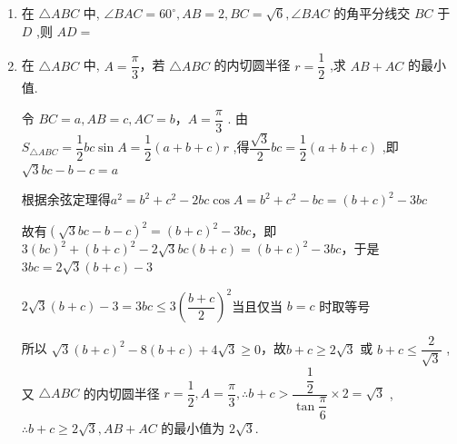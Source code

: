 \begin{enumerate}
    \item 在 $\bigtriangleup {ABC}$ 中, $\angle {BAC} = {60}^{ \circ  },{AB} = 2,{BC} = \sqrt{6},\angle {BAC}$ 的角平分线交 ${BC}$ 于 $D$ ,则 ${AD} =$
    \begin{jieda}
    \end{jieda}
    \item 在 $\bigtriangleup {ABC}$ 中, $A = \dfrac{\pi}{3}$，若 $\bigtriangleup {ABC}$ 的内切圆半径 $r = \dfrac{1}{2}$ ,求 ${AB} + {AC}$ 的最小值.
    \begin{jieda}
        令 ${BC} = a,{AB} = c,{AC} = b$，$A = \dfrac{\pi }{3}$ .
        由 ${S}_{\bigtriangleup {ABC}} = \dfrac{1}{2}{bc}\sin A = \dfrac{1}{2}\left( {a + b + c}\right) r$ ,得$\dfrac{\sqrt{3}}{2}{bc} = \dfrac{1}{2}\left( {a + b + c}\right)$ ,即 $\sqrt{3}bc - b - c = a$ 
        
        根据余弦定理得${a}^{2} = {b}^{2} + {c}^{2} - {2bc}\cos A = {b}^{2} + {c}^{2} - {bc} = (b+c)^2-3bc$

        故有$\left(\sqrt{3}{bc} - b - c\right)^2 = (b+c)^2-3bc$，即$3{\left( bc\right) }^{2} + {\left( b + c\right) }^{2} - 2\sqrt{3}{bc}\left( {b + c}\right)  = {\left( b + c\right) }^{2} - {3bc}$，于是 $3{bc} = 2\sqrt{3}\left( {b + c}\right)  - 3$

        $2\sqrt{3}\left( {b + c}\right)  - 3 = 3{bc} \leq  3{\left( \dfrac{b + c}{2}\right) }^{2}$当且仅当 $b = c$ 时取等号
        
        所以 $\sqrt{3}{\left( b + c\right) }^{2} - 8\left( {b + c}\right)  + 4\sqrt{3} \geq  0$，故$b + c \geq  2\sqrt{3}$ 或 $b + c \leq  \dfrac{2}{\sqrt{3}}$ ,
        又 $\bigtriangleup {ABC}$ 的内切圆半径 $r = \dfrac{1}{2},A = \dfrac{\pi }{3}, \therefore b + c > \dfrac{\dfrac{1}{2}}{\tan \dfrac{\pi }{6}} \times  2 = \sqrt{3}$ ,
        $\therefore b + c \geq  2\sqrt{3},{AB} + {AC}$ 的最小值为 $2\sqrt{3}$.
    \end{jieda}


\end{enumerate}
